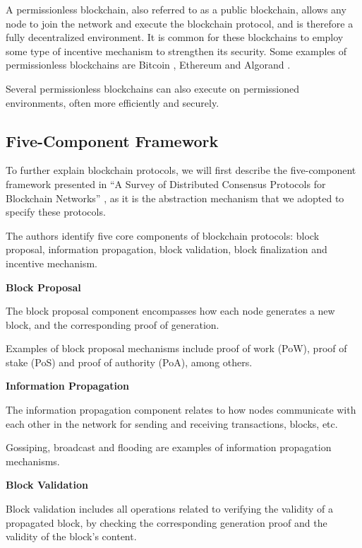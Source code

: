 A permissionless blockchain, also referred to as a public blockchain, allows any node to join the network and execute the blockchain protocol, and is therefore a fully decentralized environment. It is common for these blockchains to employ some type of incentive mechanism to strengthen its security. Some examples of permissionless blockchains are Bitcoin \cite{bitcoin}, Ethereum \cite{ethereum_whitepaper} and Algorand \cite{algorand_scale_byz_agreements}.

Several permissionless blockchains can also execute on permissioned environments, often more efficiently and securely.

\subsection{Five-Component Framework}

To further explain blockchain protocols, we will first describe the five-component framework presented in “A Survey of Distributed Consensus Protocols for Blockchain Networks” \cite{survey_bchain_networks}, as it is the abstraction mechanism that we adopted to specify these protocols.

The authors identify five core components of blockchain protocols: block proposal, information propagation, block validation, block finalization and incentive mechanism.

\vspace{0.5cm}

\textbf{Block Proposal}

The block proposal component encompasses how each node generates a new block, and the corresponding proof of generation.

Examples of block proposal mechanisms include proof of work (PoW), proof of stake (PoS) and proof of authority (PoA), among others.

\vspace{0.25cm}


\textbf{Information Propagation}

The information propagation component relates to how nodes communicate with each other in the network for sending and receiving transactions, blocks, etc.

Gossiping, broadcast and flooding are examples of information propagation mechanisms.

\vspace{0.25cm}

\textbf{Block Validation}

Block validation includes all operations related to verifying the validity of a propagated block, by checking the corresponding generation proof and the validity of the block’s content.

